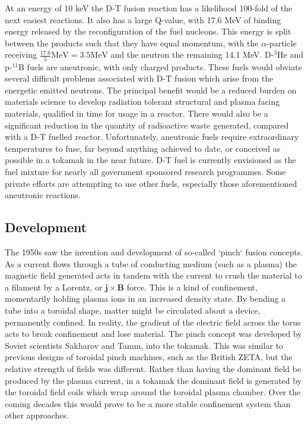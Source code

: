 At an energy of 10 keV  the D-T fusion reaction has a likelihood 100-fold of the next easiest reactions. It also has a large Q-value, with 17.6 MeV of binding energy released by the reconfiguration of the fuel nucleons. This energy is split between the products such that they have equal momentum, with the $\alpha$-particle receiving $\frac{17.6}{5} \mathrm{MeV} = 3.5 \mathrm{MeV}$ and the neutron the remaining 14.1 MeV. D-$^{3}$He and p-$^{11}$B fuels are aneutronic, with only charged products. These fuels would obviate several difficult problems associated with D-T fusion which arise from the energetic emitted neutrons. The principal benefit would be a reduced burden on materials science to develop radiation tolerant structural and plasma facing materials, qualified in time for usage in a reactor. There would also be a significant reduction in the quantity of radioactive waste generated, compared with a D-T fuelled reactor. Unfortunately, aneutronic fuels require extraordinary temperatures to fuse, far beyond anything achieved to date, or conceived as possible in a tokamak in the near future. D-T fuel is currently envisioned as the fuel mixture for nearly all government sponsored research programmes. Some private efforts are attempting to use other fuels, especially those aforementioned aneutronic reactions.

\subsection{Development}
The 1950s saw the invention and development of so-called `pinch` fusion concepts. As a current flows through a tube of conducting medium (such as a plasma) the magnetic field generated acts in tandem with the current to crush the material to a filament by a Lorentz, or $\mathbf{j \times B}$ force. This is a kind of confinement, momentarily holding plasma ions in an increased density state. By bending a tube into a toroidal shape, matter might be circulated about a device, permanently confined. In reality, the gradient of the electric field across the torus acts to break confinement and lose material. The pinch concept was developed by Soviet scientists Sakharov and Tamm, into the tokamak. This was similar to previous designs of toroidal pinch machines, such as the British ZETA,  but the relative strength of fields was different. Rather than having the dominant field be produced by the plasma current, in a tokamak the dominant field is generated by the toroidal field coils which wrap around the toroidal plasma chamber. Over the coming decades this would prove to be a more stable confinement system than other approaches. 

